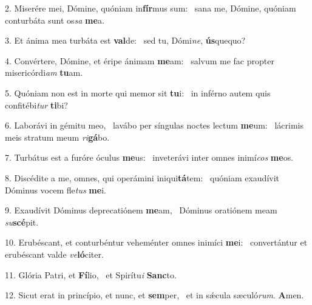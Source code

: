 2. Miserére mei, Dómine, quóniam in\textbf{fír}mus sum: \ast\  sana me, Dómine, quóniam conturbáta sunt os\textit{sa} \textbf{me}a.\

3. Et ánima mea turbáta est \textbf{val}de: \ast\  sed tu, Dómi\textit{ne}, \textbf{ús}quequo?\

4. Convértere, Dómine, et éripe ánimam \textbf{me}am: \ast\  salvum me fac propter misericórdi\textit{am} \textbf{tu}am.\

5. Quóniam non est in morte qui memor sit \textbf{tu}i: \ast\  in inférno autem quis confitébi\textit{tur} \textbf{ti}bi?\

6. Laborávi in gémitu meo, \dag\  lavábo per síngulas noctes lectum \textbf{me}um: \ast\  lácrimis meis stratum meum \textit{ri}\textbf{gá}bo.\

7. Turbátus est a furóre óculus \textbf{me}us: \ast\  inveterávi inter omnes inimí\textit{cos} \textbf{me}os.\

8. Discédite a me, omnes, qui operámini iniqui\textbf{tá}tem: \ast\  quóniam exaudívit Dóminus vocem fle\textit{tus} \textbf{me}i.\

9. Exaudívit Dóminus deprecatiónem \textbf{me}am, \ast\  Dóminus oratiónem meam \textit{su}\textbf{scé}pit.\

10. Erubéscant, et conturbéntur veheménter omnes inimíci \textbf{me}i: \ast\  convertántur et erubéscant valde \textit{ve}\textbf{ló}citer.\

11. Glória Patri, et \textbf{Fí}lio, \ast\  et Spirítu\textit{i} \textbf{Sanc}to.\

12. Sicut erat in princípio, et nunc, et \textbf{sem}per, \ast\  et in sǽcula sæculó\textit{rum}. \textbf{A}men.\

